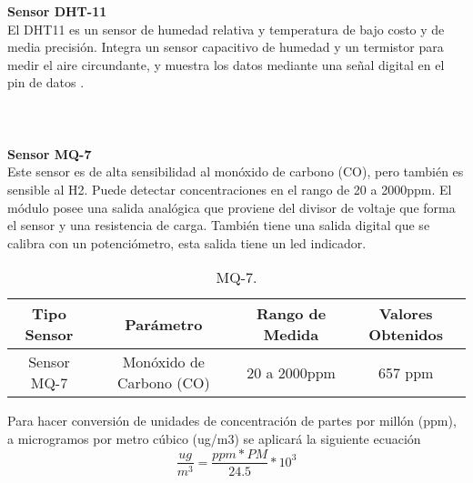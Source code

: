 \documentclass[10pt,a4paper]{article}
\begin{document}
\textbf{Sensor DHT-11}\\

El DHT11 es un sensor de humedad relativa y temperatura de bajo costo y de media precisión. Integra un sensor capacitivo de humedad y un termistor para medir el aire circundante, y muestra los datos mediante una señal digital en el pin de datos . \\\\\\\\

\textbf{Sensor MQ-7}\\

Este sensor es de alta sensibilidad al monóxido de carbono (CO), pero también es sensible al H2.  Puede detectar concentraciones en el rango de 20 a 2000ppm.
El módulo posee una salida analógica que proviene del divisor de voltaje que forma el sensor y una resistencia de carga. También tiene una salida digital que se calibra con un potenciómetro, esta salida tiene un led indicador.

\begin{table}[t]
\begin{center}
\begin{tabular}{| c | c | c | c |}  
\hline
 
\textbf {Tipo Sensor} & \textbf {Parámetro} &  \textbf {Rango de Medida} & \textbf  {Valores Obtenidos} \\  \hline
Sensor MQ-7 & Monóxido de Carbono (CO) & 20 a 2000ppm & 657 ppm \\ \hline
\end{tabular}
\caption{ MQ-7.}
\end{center}
\end{table}
Para hacer conversión de unidades de concentración de partes por millón (ppm), a microgramos por metro cúbico (ug/m3) se aplicará la siguiente ecuación\\
\begin{equation}
\frac{ug}{m^{3}}= \frac{ppm * PM}{24.5}*10^{3}
\end{equation} \\
\end{document}
